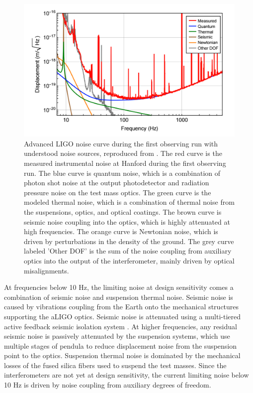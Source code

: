 \begin{figure}[ht!]
\includegraphics[width=\textwidth]{figures/introduction/noise-budget}
\caption[Advanced LIGO noise budget]{Advanced LIGO noise curve during the first %
         observing run with %
         understood noise sources, reproduced from \cite{GW150914-DETECTORS}. %
         The red curve is the measured instrumental noise at Hanford during the first %
         observing run. The blue curve is quantum noise, which is a combination of %
         photon shot noise at the output photodetector and radiation pressure noise %
         on the test mass optics. The green curve is the modeled thermal noise, which is a %
         combination of thermal noise from the suspensions, optics, and optical %
         coatings. The brown curve is seismic noise coupling into the optics, %
         which is highly attenuated at high frequencies. The orange curve is %
         Newtonian noise, which is driven by perturbations in the density of %
         the ground. The grey curve labeled 'Other DOF' is the sum of the %
         noise coupling from auxiliary optics into the output of the interferometer, %
         mainly driven by optical misalignments.
        }
\label{fig:noise-budget}
\end{figure}

At frequencies below 10 Hz, the limiting noise at design sensitivity 
comes a combination of seismic 
noise and suspension thermal noise. Seismic noise is caused by vibrations coupling 
from the Earth onto the mechanical structures supporting the aLIGO optics. 
Seismic noise is attenuated using 
a multi-tiered active feedback seismic isolation system \cite{SeiReview,HEPI}. At higher 
frequencies, any residual seismic noise is passively attenuated by the 
suspension systems, which use multiple stages of pendula to reduce displacement noise 
from the suspension point to the optics.
Suspension thermal noise is dominated by the mechanical losses of the fused 
silica fibers used to suspend the test masses. 
Since the interferometers are not yet at design sensitivity, the current 
limiting noise below 10 Hz is driven by noise coupling from auxiliary 
degrees of freedom.


